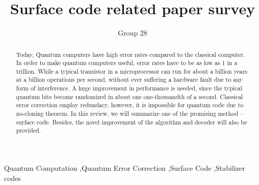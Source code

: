 \documentclass[final,5p,times,twocolumn,authoryear]{elsarticle}
\begin{document}
\begin{frontmatter}

    \title{Surface code related paper survey}

    \author{Group 28}

    \begin{abstract}
        Today, Quantum computers have high error rates compared to the classical computer. In order to make quantum computers useful, error rates have to be as low as 1 in a trillion. While a typical transistor in a microprocessor can run for about a billion years at a billion operations per second, without ever suffering a hardware fault due to any form of interference. A huge improvement in performance is needed, since the typical quantum bits become randomized in about one one-thousandth of a second. Classical error correction employ redundacy, however, it is impossible for quantum code due to no-cloning theorem. In this review, we will summarize one of the promising method – surface code. Besides, the novel improvement of the algorithm and decoder will also be provided.
    \end{abstract}



    \begin{keyword}
        Quantum Computation \sep Quantum Error Correction \sep Surface Code \sep Stabilizer codes



    \end{keyword}


\end{frontmatter}

\end{document}

